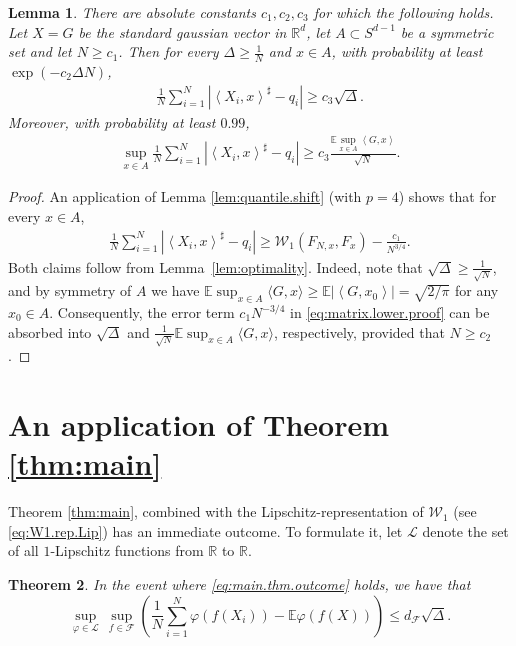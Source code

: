 \documentclass[11pt]{amsart}
\newcommand{\R}{\mathbb{R}}
\newcommand{\inr}[1]{\left\langle #1 \right\rangle}
\newcommand{\W}{\mathcal{W}}
\newtheorem{theorem}{Theorem}[section]
\newtheorem{lemma}[theorem]{Lemma}
\theoremstyle{definition}
\newcommand{\E}{\mathbb{E}}
\numberwithin{equation}{section}
\begin{document}
\begin{lemma}
\label{lem:optimality.matrix}
	There are absolute constants $c_{1},c_2,c_3$ for which the following holds.
	Let $X=G$ be the standard gaussian vector in $\R^d$, let $A\subset S^{d-1}$ be a symmetric set and let $N\geq c_1$.
	Then for every $\Delta \geq \frac{1}{N}$ and $x\in A$, with probability at least $\exp(-c_{2}\Delta N)$,
\begin{align*}
 \frac{1}{N}\sum_{i=1}^N \left|\inr{X_i,x}^\sharp - q_i\right| 
\geq  c_{3}\sqrt\Delta.
\end{align*}
Moreover, with probability at least $0.99$,
\begin{align*}
\sup_{x\in A}  \frac{1}{N}\sum_{i=1}^N \left|\inr{X_i,x}^\sharp - q_i\right| 
	\geq c_3\frac{\E \sup_{x\in A} \inr{G,x}}{\sqrt N}.
\end{align*}
\end{lemma}
\begin{proof}
	An application of  Lemma \ref{lem:quantile.shift} (with $p=4$) shows that  for every $x\in A$,
	\begin{align}
	\label{eq:matrix.lower.proof}
	 \frac{1}{N} \sum_{i=1}^N \left|\inr{X_i,x}^\sharp - q_i\right| 
	\geq  \W_1(F_{N,x} , F_x) - \frac{c_1}{N^{3/4}}.
	\end{align}
	Both claims follow from Lemma~\ref{lem:optimality}.
	Indeed, note that $\sqrt{\Delta} \geq \frac{1}{\sqrt N}$, and by symmetry of $A$ we have
$\E \sup_{x\in A} \langle G, x\rangle \geq \E |\inr{G,x_0}|=\sqrt{2/\pi}$ for any $x_0\in A$.
	Consequently, the error term $c_1 N^{-3/4}$ in \eqref{eq:matrix.lower.proof} can be absorbed into $\sqrt{\Delta}$ and $\frac{1}{\sqrt{N}} \E \sup_{x\in A} \langle G, x\rangle$, respectively, provided that $N \geq c_2$.
\end{proof}


\appendix



\section{An application of Theorem \ref{thm:main}}
\label{sec:app.application}

Theorem \ref{thm:main}, combined with the Lipschitz-representation of $\W_1$ (see \eqref{eq:W1.rep.Lip}) has an immediate outcome.
To formulate it, let $\mathcal{L}$ denote the set of all $1$-Lipschitz functions from $\R$ to $\R$.

\begin{theorem}
\label{thm:lipschitz}
    In the event where \eqref{eq:main.thm.outcome} holds, we have that
    \[ \sup_{\varphi \in \mathcal{L}}\,\sup_{f\in\mathcal{F}} 
    \left( \frac{1}{N}\sum_{i=1}^N \varphi(f(X_i)) - \E \varphi(f(X)) \right) \leq d_\mathcal{F}\sqrt\Delta.\]
\end{theorem}
\end{document}
